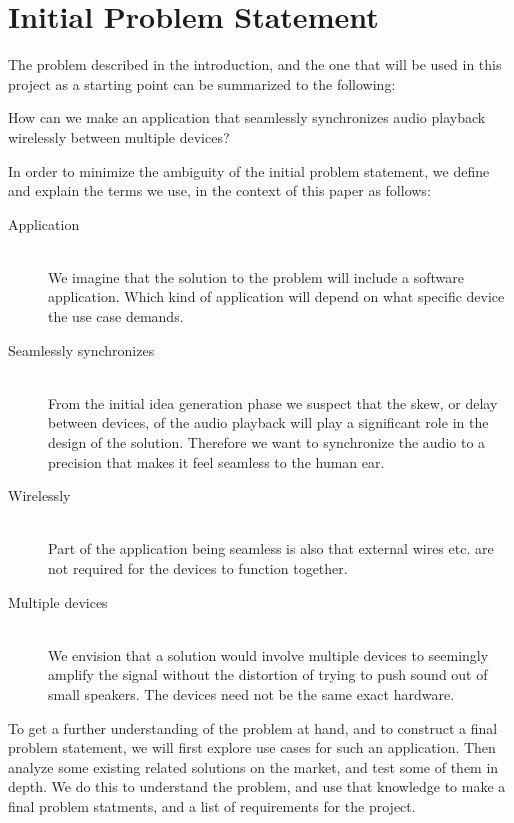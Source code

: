 \section{Initial Problem Statement}\label{sec:initial_problem}

The problem described in the introduction, and the one that will be used
in this project as a starting point can be summarized to the following:

\begin{problemstatement}
	How can we make an application that seamlessly synchronizes audio
	playback wirelessly between multiple devices?
\end{problemstatement}

\noindent
In order to minimize the ambiguity of the initial problem statement, 
we define and explain the terms we use, in the context of this paper as follows:

\begin{description}
	\item[Application] \hfill \\
		We imagine that the solution to the problem will include a software
		application. Which kind of application will depend on what specific
		device the use case demands.
	\item[Seamlessly synchronizes]  \hfill \\
		From the initial idea generation phase we suspect
		that the skew, or delay between devices, of the audio playback will
		play a significant role in the design of the solution. Therefore we
		want to synchronize the audio to a precision that makes it feel
		seamless to the human ear.
	\item[Wirelessly]  \hfill \\
		Part of the application being seamless is also that external wires etc. are
		not required for the devices to function together.
	\item[Multiple devices]  \hfill \\
		We envision that a solution would involve multiple devices to seemingly
		amplify the signal without the distortion of trying to push sound out of
		small speakers. The devices need not be the same exact hardware.
\end{description}

To get a further understanding of the problem at hand, and to
construct a final problem statement, we will first explore use
cases for such an application. 
Then analyze some existing related solutions on the market, 
and test some of them in depth. 
We do this to understand the problem, and use that knowledge
to make a final problem statments, and a list of requirements for the project. 
